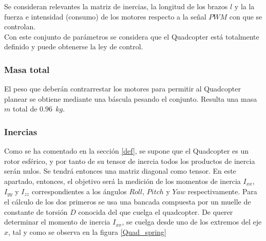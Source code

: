 \documentclass[twoside,11pt]{book}
\begin{document}
Se consideran relevantes la matriz de inercias, la longitud de los brazos  $l$ y la la fuerza e intensidad (consumo) de los motores respecto a la señal $PWM$ con que se controlan.\\

Con este conjunto de parámetros se considera que el Quadcopter está totalmente definido y puede obtenerse la ley de control.

\subsubsection*{Masa total}

El peso que deberán contrarrestar los motores para permitir al Quadcopter planear se obtiene mediante una báscula pesando el conjunto. Resulta una masa $m$ total de $0.96 \>\> kg$.  

\subsubsection*{Inercias}

Como se ha comentado en la sección \ref{def}, se supone que el Quadcopter es un rotor esférico, y por tanto de su tensor de inercia todos los productos de inercia serán nulos. Se tendrá entonces una matriz diagonal como tensor. En este apartado, entonces, el objetivo será la medición de los momentos de inercia $I_{xx}$, $I_{yy}$ y $I_{zz}$ correspondientes a los ángulos $Roll$, $Pitch$ y $Yaw$ respectivamente. Para el cálculo de los dos primeros se usa una bancada compuesta por un muelle de constante de torsión $D$ conocida del que cuelga el quadcopter. De querer determinar el momento de inercia $I_{xx}$, se cuelga desde uno de los extremos del eje $x$, tal y como se observa en la figura \ref{Quad_spring}
\end{document}
